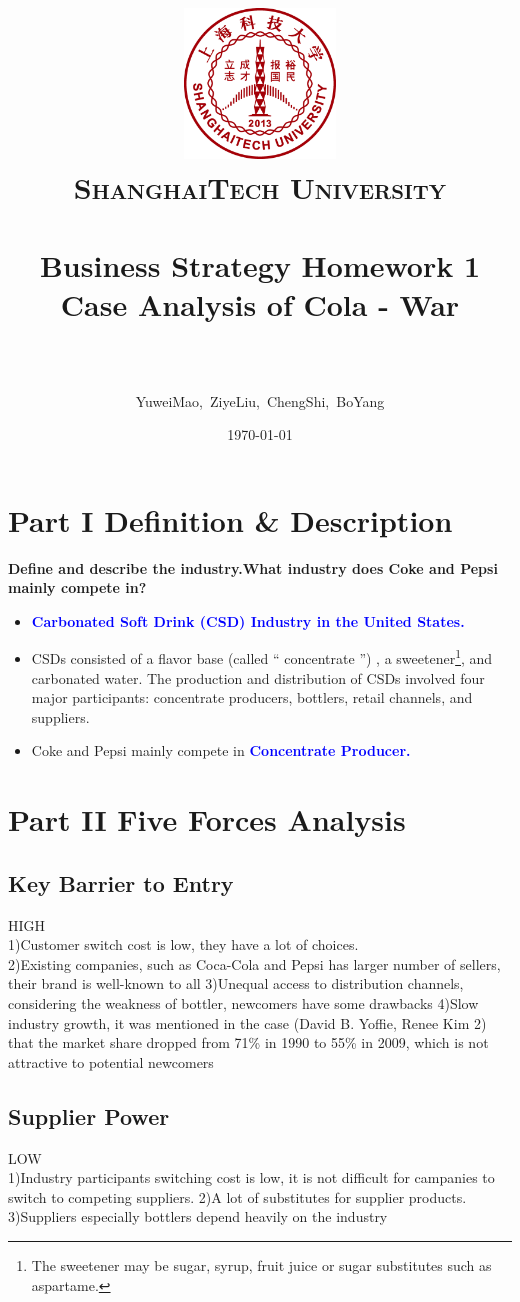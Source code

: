 \documentclass[english]{article}
\title{
\begin{center}
\includegraphics[width=0.3\textwidth]{pics/x1.eps}\\[1cm] 
    \normalfont \normalsize
    \textsc{ShanghaiTech University} \\ [25pt]
    \horrule{1pt} \\[0.4cm] %
    \huge Business Strategy Homework 1\\ %
    \huge \textbf{Case Analysis of Cola - War}\\
    \horrule{1pt} \\[0.5cm] %
\end{center}}
\author{YuweiMao,\ ZiyeLiu,\ ChengShi,\ BoYang}
\date{ \today}
\begin{document}
\maketitle
\pagebreak
\section{Part I \quad Definition \& Description}
\textbf{Define and describe the industry.What industry does Coke and Pepsi mainly compete in?}
\begin{itemize}
    \item \textbf{\textcolor{blue}{Carbonated Soft Drink (CSD) Industry in the United States.}}
    \item  CSDs consisted of a flavor base (called “ concentrate ”) , a sweetener\footnote{The sweetener may be sugar, syrup, fruit juice or sugar substitutes such as aspartame.}, and carbonated water. The production and distribution of CSDs involved four major participants: concentrate producers, bottlers, retail channels, and suppliers.
    \item Coke and Pepsi mainly compete in \textbf{\textcolor{blue}{Concentrate Producer.}}
\end{itemize}


\section{Part II \quad Five Forces Analysis}
\subsection{Key Barrier to Entry}
HIGH \\
1)Customer switch cost is low, they have a lot of choices.\\
2)Existing companies, such as Coca-Cola and Pepsi has larger number of sellers, their brand is well-known to all
3)Unequal access to distribution channels, considering the weakness of bottler, newcomers have some drawbacks
4)Slow industry growth, it was mentioned in the case (David B. Yoffie, Renee Kim 2) that the market share dropped from 71\% in 1990 to 55\% in 2009, which is not attractive to potential newcomers
\subsection{Supplier Power}
LOW\\
1)Industry participants switching cost is low, it is not difficult for campanies to switch to competing suppliers.
2)A lot of substitutes for supplier products.
3)Suppliers especially bottlers depend heavily on the industry
\end{document}
